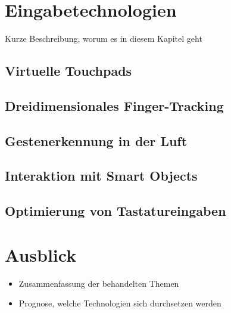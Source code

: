 \documentclass[oneside]{elaboration}
\begin{document}

\chapter{Eingabetechnologien}\label{Eingabetechnologien}
Kurze Beschreibung, worum es in diesem Kapitel geht

\section{Virtuelle Touchpads}\label{Virtuelle Touchpads}


\section{Dreidimensionales Finger-Tracking}\label{Finger-Tracking}


\section{Gestenerkennung in der Luft}\label{Gestenerkennung}


\section{Interaktion mit Smart Objects}\label{Smart Objects}


\section{Optimierung von Tastatureingaben}\label{Tastaturoptimierung}



\chapter{Ausblick}\label{Ausblick}
\begin{itemize}
\item Zusammenfassung der behandelten Themen
\item Prognose, welche Technologien sich durchsetzen werden
\end{itemize}


\raggedright
{}
\end{document}
